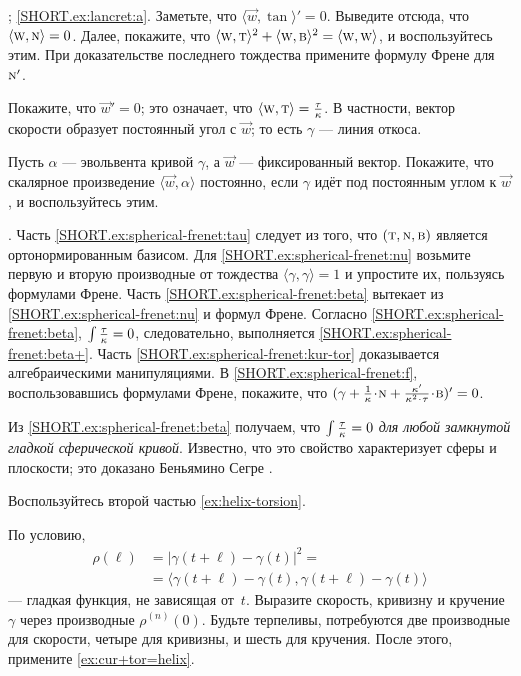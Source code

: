 \begin{multicols}{2}
\parbf{\ref{ex:lancret}}; \ref{SHORT.ex:lancret:a}.
Заметьте, что 
$\langle \vec w,\tan\rangle'=0$.
Выведите отсюда, что $\langle \text{\sc{w}}, \text{\sc{n}}\rangle =0$.
Далее, покажите, что $\langle \text{\sc{w}}, \text{\sc{t}}\rangle^2+\langle \text{\sc{w}}, \text{\sc{b}}\rangle^2=\langle \text{\sc{w}}, \text{\sc{w}}\rangle$, и воспользуйтесь этим.
При доказательстве последнего тождества примените формулу Френе для~$\text{\sc{n}}'$.

Покажите, что $\vec w'=0$;
это означает, что $\langle \vec w,\tan\rangle\z=\tfrac\tor\kur$.
В частности, вектор скорости образует постоянный угол с $\vec w$; то есть $\gamma$ --- линия откоса.

Пусть $\alpha$ --- эвольвента кривой $\gamma$, а $\vec w$ --- фиксированный вектор.
Покажите, что скалярное произведение $\langle \vec w,\alpha\rangle$ постоянно, если $\gamma$ идёт под постоянным углом к $\vec w$, и воспользуйтесь этим.

\parbf{\ref{ex:spherical-frenet}}.
Часть \ref{SHORT.ex:spherical-frenet:tau} следует из того, что $(\text{\sc{t}},\text{\sc{n}},\text{\sc{b}})$ является ортонормированным базисом.
Для \ref{SHORT.ex:spherical-frenet:nu} возьмите первую и вторую производные от тождества $\langle\gamma,\gamma\rangle=1$ и упростите их, пользуясь формулами Френе.
Часть \ref{SHORT.ex:spherical-frenet:beta} вытекает из \ref{SHORT.ex:spherical-frenet:nu} и формул Френе.
Согласно \ref{SHORT.ex:spherical-frenet:beta}, $\int\tfrac{\tau}{\kappa}=0$, следовательно, выполняется \ref{SHORT.ex:spherical-frenet:beta+}.
Часть \ref{SHORT.ex:spherical-frenet:kur-tor} доказывается алгебраическими манипуляциями.
В \ref{SHORT.ex:spherical-frenet:f},
воспользовавшись формулами Френе, покажите, что $(\gamma+\tfrac1\kur\cdot \norm+\tfrac{\kur'}{\kur^2\cdot\tor}\cdot\bi)'=0$.

Из \ref{SHORT.ex:spherical-frenet:beta} получаем, что \textit{$\int\tfrac{\tau}{\kappa}=0$ для любой замкнутой гладкой сферической кривой}.
Известно, что это свойство характеризует сферы и плоскости; это доказано Беньямино Сегре \cite{segre}.

Воспользуйтесь второй частью \ref{ex:helix-torsion}.

По условию,
\begin{align*}
\rho(\ell)&=|\gamma(t+\ell)-\gamma(t)|^2=
\\
&=\langle \gamma(t+\ell)-\gamma(t),\gamma(t+\ell)-\gamma(t)\rangle
\end{align*}
--- гладкая функция, не зависящая от~$t$.
Выразите скорость, кривизну и кручение $\gamma$ через производные $\rho^{(n)}(0)$.
Будьте терпеливы, потребуются две производные для скорости,
четыре для кривизны,
и шесть для кручения.
После этого, примените \ref{ex:cur+tor=helix}.



\end{multicols}
